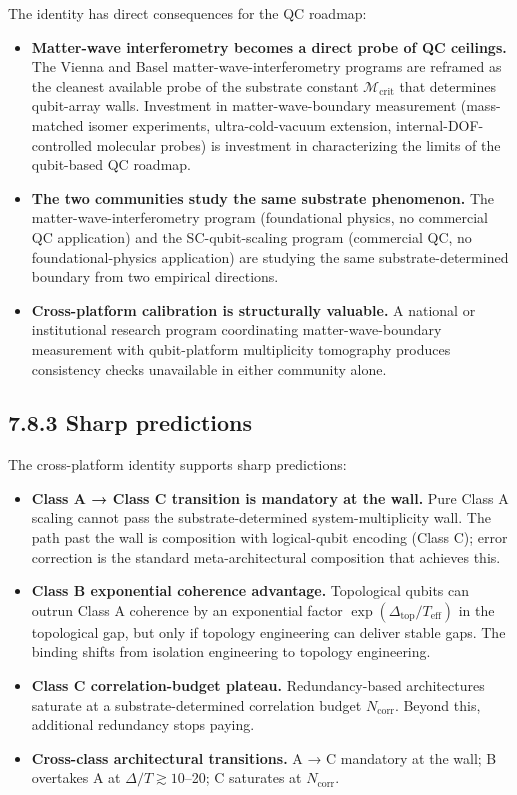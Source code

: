 \documentclass[11pt]{book}
\begin{document}
The identity has direct consequences for the QC roadmap:

\begin{itemize}
\item \textbf{Matter-wave interferometry becomes a direct probe of QC ceilings.} The Vienna and Basel matter-wave-interferometry programs are reframed as the cleanest available probe of the substrate constant $\mathcal{M}_\mathrm{crit}$ that determines qubit-array walls. Investment in matter-wave-boundary measurement (mass-matched isomer experiments, ultra-cold-vacuum extension, internal-DOF-controlled molecular probes) is investment in characterizing the limits of the qubit-based QC roadmap.
\item \textbf{The two communities study the same substrate phenomenon.} The matter-wave-interferometry program (foundational physics, no commercial QC application) and the SC-qubit-scaling program (commercial QC, no foundational-physics application) are studying the same substrate-determined boundary from two empirical directions.
\item \textbf{Cross-platform calibration is structurally valuable.} A national or institutional research program coordinating matter-wave-boundary measurement with qubit-platform multiplicity tomography produces consistency checks unavailable in either community alone.
\end{itemize}

\subsection{7.8.3 Sharp predictions}

The cross-platform identity supports sharp predictions:

\begin{itemize}
\item \textbf{Class A → Class C transition is mandatory at the wall.} Pure Class A scaling cannot pass the substrate-determined system-multiplicity wall. The path past the wall is composition with logical-qubit encoding (Class C); error correction is the standard meta-architectural composition that achieves this.
\item \textbf{Class B exponential coherence advantage.} Topological qubits can outrun Class A coherence by an exponential factor $\exp(\Delta_\mathrm{top}/T_\mathrm{eff})$ in the topological gap, but only if topology engineering can deliver stable gaps. The binding shifts from isolation engineering to topology engineering.
\item \textbf{Class C correlation-budget plateau.} Redundancy-based architectures saturate at a substrate-determined correlation budget $N_\mathrm{corr}$. Beyond this, additional redundancy stops paying.
\item \textbf{Cross-class architectural transitions.} A → C mandatory at the wall; B overtakes A at $\Delta/T \gtrsim 10$–20; C saturates at $N_\mathrm{corr}$.
\end{itemize}
\end{document}
